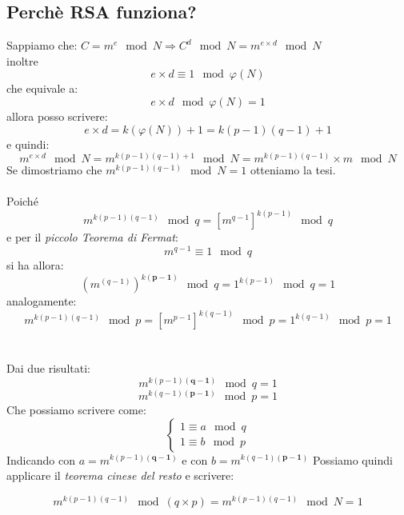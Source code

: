 \documentclass[10pt,a4paper]{article}
\begin{document}
\subsection{Perchè RSA funziona?}
Sappiamo che:
$ \boxed{C=m^e \mod N} \Rightarrow C^d \mod N=m^{e\times d} \mod N$\\ inoltre  \[\boxed{ e\times d \equiv1 \mod \varphi(N)} \] che equivale a:\[ e\times d \mod \varphi(N) =1 \]
allora posso scrivere: \[ e\times d=k(\varphi(N))+1=k(p-1)(q-1)+1 \] e quindi:
\[ m^{e\times d} \mod N=m^{k(p-1)(q-1)+1} 	\mod N=m^{k(p-1)(q-1)}\times m 	\mod N \]
Se dimostriamo che $\boxed{ m^{k(p-1)(q-1)} 	\mod N=1 }$ otteniamo la tesi. 
\\\\
Poiché \[m^{k(p-1)(q-1)} 	\mod q=[m^{q-1}]^{k(p-1)} 	\mod q  \]
e per il \textit{piccolo Teorema di Fermat}: \[\boxed{ m^{q-1} \equiv 1 \mod q} \]
si ha allora: \[ (m^{(q-1)})^{k\mathbf{(p-1)}} 	\mod q=1^{k(p-1)} 	\mod q=1 \] analogamente:
\[m^{k(p-1)(q-1)} 	\mod p=[m^{p-1}]^{k(q-1)} 	\mod p=1^{k(q-1)} \mod p=1  \]
 \\\\
 Dai due risultati: 
  \[m^{k(p-1)\mathbf{(q-1)}} 	\mod q=1\]  \[  m^{k(q-1)\mathbf{(p-1)}} 	\mod p=1  \]
  Che possiamo scrivere come:
  \[ \left\{
     \begin{array}{rl}
     1\equiv a \mod q\\
     1\equiv b \mod p
     \end{array}
     \right.   \]
     Indicando con $\boxed{a=m^{k(p-1)\mathbf{(q-1)}} } $ e con $ \boxed{b=m^{k(q-1)\mathbf{(p-1)}}} $
 Possiamo quindi applicare  il \textit{teorema cinese del resto}  e   scrivere:
 
 \[ m^{k(p-1)(q-1)} 	\mod (q\times p)= m^{k(p-1)(q-1)} 	\mod N=1 \]  
\end{document}
